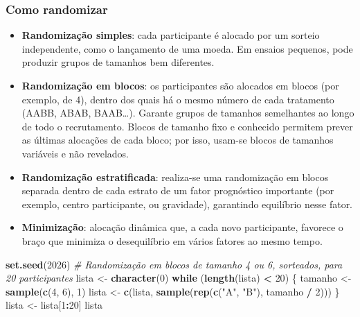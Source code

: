 \documentclass[
]{book}
\newenvironment{Shaded}{\begin{snugshade}}{\end{snugshade}}
\newcommand{\CommentTok}[1]{\textcolor[rgb]{0.56,0.35,0.01}{\textit{#1}}}
\newcommand{\ControlFlowTok}[1]{\textcolor[rgb]{0.13,0.29,0.53}{\textbf{#1}}}
\newcommand{\DecValTok}[1]{\textcolor[rgb]{0.00,0.00,0.81}{#1}}
\newcommand{\FunctionTok}[1]{\textcolor[rgb]{0.13,0.29,0.53}{\textbf{#1}}}
\newcommand{\NormalTok}[1]{#1}
\newcommand{\OtherTok}[1]{\textcolor[rgb]{0.56,0.35,0.01}{#1}}
\newcommand{\SpecialCharTok}[1]{\textcolor[rgb]{0.81,0.36,0.00}{\textbf{#1}}}
\newcommand{\StringTok}[1]{\textcolor[rgb]{0.31,0.60,0.02}{#1}}
\providecommand{\tightlist}{%
  \setlength{\itemsep}{0pt}\setlength{\parskip}{0pt}}
\begin{document}
\subsubsection{Como randomizar}\label{como-randomizar}

\begin{itemize}
\tightlist
\item
  \textbf{Randomização simples}: cada participante é alocado por um sorteio independente, como o lançamento de uma moeda. Em ensaios pequenos, pode produzir grupos de tamanhos bem diferentes.
\item
  \textbf{Randomização em blocos}: os participantes são alocados em blocos (por exemplo, de 4), dentro dos quais há o mesmo número de cada tratamento (AABB, ABAB, BAAB\ldots). Garante grupos de tamanhos semelhantes ao longo de todo o recrutamento. Blocos de tamanho fixo e conhecido permitem prever as últimas alocações de cada bloco; por isso, usam-se blocos de tamanhos variáveis e não revelados.
\item
  \textbf{Randomização estratificada}: realiza-se uma randomização em blocos separada dentro de cada estrato de um fator prognóstico importante (por exemplo, centro participante, ou gravidade), garantindo equilíbrio nesse fator.
\item
  \textbf{Minimização}: alocação dinâmica que, a cada novo participante, favorece o braço que minimiza o desequilíbrio em vários fatores ao mesmo tempo.
\end{itemize}

\begin{Shaded}
\begin{Highlighting}[]
\FunctionTok{set.seed}\NormalTok{(}\DecValTok{2026}\NormalTok{)}
\CommentTok{\# Randomização em blocos de tamanho 4 ou 6, sorteados, para 20 participantes}
\NormalTok{lista }\OtherTok{\textless{}{-}} \FunctionTok{character}\NormalTok{(}\DecValTok{0}\NormalTok{)}
\ControlFlowTok{while}\NormalTok{ (}\FunctionTok{length}\NormalTok{(lista) }\SpecialCharTok{\textless{}} \DecValTok{20}\NormalTok{) \{}
\NormalTok{  tamanho }\OtherTok{\textless{}{-}} \FunctionTok{sample}\NormalTok{(}\FunctionTok{c}\NormalTok{(}\DecValTok{4}\NormalTok{, }\DecValTok{6}\NormalTok{), }\DecValTok{1}\NormalTok{)}
\NormalTok{  lista }\OtherTok{\textless{}{-}} \FunctionTok{c}\NormalTok{(lista, }\FunctionTok{sample}\NormalTok{(}\FunctionTok{rep}\NormalTok{(}\FunctionTok{c}\NormalTok{(}\StringTok{"A"}\NormalTok{, }\StringTok{"B"}\NormalTok{), tamanho }\SpecialCharTok{/} \DecValTok{2}\NormalTok{)))}
\NormalTok{\}}
\NormalTok{lista }\OtherTok{\textless{}{-}}\NormalTok{ lista[}\DecValTok{1}\SpecialCharTok{:}\DecValTok{20}\NormalTok{]}
\NormalTok{lista}
\end{Highlighting}
\end{Shaded}
\end{document}
